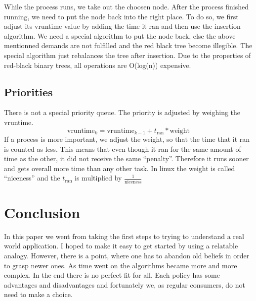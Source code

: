 While the process runs, we take out the choosen node.
After the process finished running, we need to put the node back into the right place.
To do so, we first adjust its vruntime value by adding the time it ran and then use the insertion algorithm.
We need a special algorithm to put the node back, else the above mentionned demands are not fulfilled and the red black tree become illegible. The special algorithm just rebalances the tree after insertion.
Due to the properties of red-black binary trees, all operations are O(log(n)) expensive.

\subsection{Priorities}

There is not a special priority queue. The priority is adjusted by weighing the vruntime.
$$ \text{vruntime}_k = \text{vruntime}_{k-1} + t_{\text{ran}}*\text{weight} $$
If a process is more important, we adjust the weight, so that the time that it ran is counted as less. 
This means that even though it ran for the same amount of time as the other, it did not receive the same ``penalty''.
Therefore it runs sooner and gets overall more time than any other task.
In linux the weight is called ``niceness'' and the $t_{\text{ran}}$ is multiplied by $\frac{1}{\text{niceness}}$


\section*{Conclusion}

In this paper we went from taking the first steps to trying to understand a real world application.
I hoped to make it easy to get started by using a relatable analogy.
However, there is a point, where one has to abandon old beliefs in order to grasp newer ones.
As time went on the algorithms became more and more complex.
In the end there is no perfect fit for all. Each policy has some advantages and disadvantages and fortunately we, as regular consumers, do not need to make a choice.

